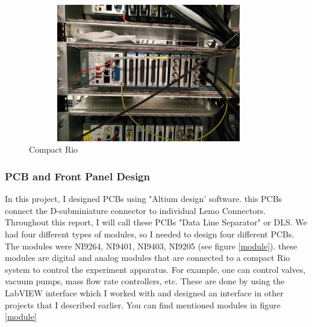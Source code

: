 \documentclass[12pt,a4paper]{article}
\begin{document}
\begin{figure}[h]
\centering
\includegraphics[width=105mm, height=60mm]{crio}
\caption{Compact Rio}
\label{crio}
\end{figure}

\subsubsection{PCB and Front Panel Design}
In this project, I designed PCBs using "Altium design' software. this PCBs connect the D-subminiature connector to individual Lemo Connectors. Throughout this report, I will call these PCBs "Data Line Separator" or DLS. We had four different types of modules, so I needed to design four different PCBs.
The modules were NI9264, NI9401, NI9403, NI9205 (see figure \ref{module}). these modules are digital and analog modules that are connected to a compact Rio system to control the experiment apparatus. For example, one can control valves, vacuum pumps, mass flow rate controllers, etc. These are done by using the LabVIEW interface which I worked with and designed an interface in other projects that I described earlier. You can find mentioned modules in figure \ref{module}
\end{document}
